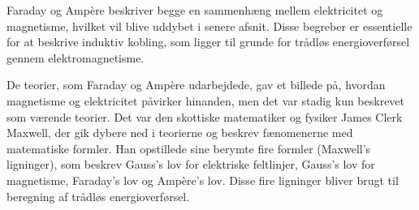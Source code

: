 Faraday og Ampère beskriver begge en sammenhæng mellem elektricitet og magnetisme, hvilket vil blive uddybet i senere afsnit. Disse begreber er essentielle for at beskrive induktiv kobling, som ligger til grunde for trådløs energioverførsel gennem elektromagnetisme.

De teorier, som Faraday og Ampère udarbejdede, gav et billede på, hvordan magnetisme og elektricitet påvirker hinanden, men det var stadig kun beskrevet som værende teorier. Det var den skottiske matematiker og fysiker James Clerk Maxwell, der gik dybere ned i teorierne og beskrev fænomenerne med matematiske formler. Han opstillede sine berymte fire formler (Maxwell's ligninger), som beskrev Gauss's lov for elektriske feltlinjer, Gauss's lov for magnetisme, Faraday's lov og Ampère's lov. Disse fire ligninger bliver brugt til beregning af trådløs energioverførsel.
\newpage